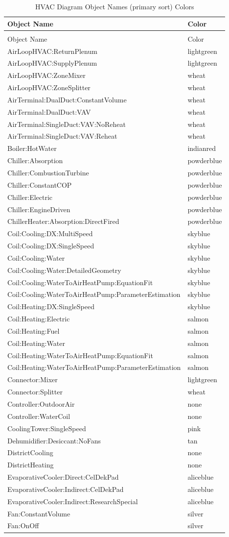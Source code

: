 \begin{longtable}[c]{@{}ll@{}}
\caption{HVAC Diagram Object Names (primary sort) Colors \label{table:hvac-diagram-object-names-primary-sort-colors}} \tabularnewline
\toprule
Object Name & Color \tabularnewline
\midrule
\endfirsthead

\caption[]{HVAC Diagram Object Names (primary sort) Colors} \tabularnewline
\toprule
Object Name & Color \tabularnewline
\midrule
\endhead

AirLoopHVAC:ReturnPlenum & lightgreen \tabularnewline
AirLoopHVAC:SupplyPlenum & lightgreen \tabularnewline
AirLoopHVAC:ZoneMixer & wheat \tabularnewline
AirLoopHVAC:ZoneSplitter & wheat \tabularnewline
AirTerminal:DualDuct:ConstantVolume & wheat \tabularnewline
AirTerminal:DualDuct:VAV & wheat \tabularnewline
AirTerminal:SingleDuct:VAV:NoReheat & wheat \tabularnewline
AirTerminal:SingleDuct:VAV:Reheat & wheat \tabularnewline
Boiler:HotWater & indianred \tabularnewline
Chiller:Absorption & powderblue \tabularnewline
Chiller:CombustionTurbine & powderblue \tabularnewline
Chiller:ConstantCOP & powderblue \tabularnewline
Chiller:Electric & powderblue \tabularnewline
Chiller:EngineDriven & powderblue \tabularnewline
ChillerHeater:Absorption:DirectFired & powderblue \tabularnewline
Coil:Cooling:DX:MultiSpeed & skyblue \tabularnewline
Coil:Cooling:DX:SingleSpeed & skyblue \tabularnewline
Coil:Cooling:Water & skyblue \tabularnewline
Coil:Cooling:Water:DetailedGeometry & skyblue \tabularnewline
Coil:Cooling:WaterToAirHeatPump:EquationFit & skyblue \tabularnewline
Coil:Cooling:WaterToAirHeatPump:ParameterEstimation & skyblue \tabularnewline
Coil:Heating:DX:SingleSpeed & skyblue \tabularnewline
Coil:Heating:Electric & salmon \tabularnewline
Coil:Heating:Fuel & salmon \tabularnewline
Coil:Heating:Water & salmon \tabularnewline
Coil:Heating:WaterToAirHeatPump:EquationFit & salmon \tabularnewline
Coil:Heating:WaterToAirHeatPump:ParameterEstimation & salmon \tabularnewline
Connector:Mixer & lightgreen \tabularnewline
Connector:Splitter & wheat \tabularnewline
Controller:OutdoorAir & none \tabularnewline
Controller:WaterCoil & none \tabularnewline
CoolingTower:SingleSpeed & pink \tabularnewline
Dehumidifier:Desiccant:NoFans & tan \tabularnewline
DistrictCooling & none \tabularnewline
DistrictHeating & none \tabularnewline
EvaporativeCooler:Direct:CelDekPad & aliceblue \tabularnewline
EvaporativeCooler:Indirect:CelDekPad & aliceblue \tabularnewline
EvaporativeCooler:Indirect:ResearchSpecial & aliceblue \tabularnewline
Fan:ConstantVolume & silver \tabularnewline
Fan:OnOff & silver \tabularnewline

\end{longtable}

